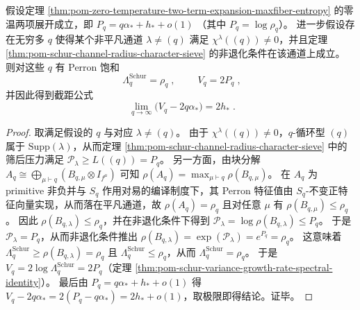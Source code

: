 \begin{proposition}\label{prop:pom-variance-intercept-equals-groundstate-entropy}
假设定理 \ref{thm:pom-zero-temperature-two-term-expansion-maxfiber-entropy} 的零温两项展开成立，即
\(
P_q=q\alpha_\ast+h_\ast+o(1)
\)
（其中 \(P_q=\log\rho_q\)）。
进一步假设存在无穷多 \(q\) 使得某个非平凡通道 \(\lambda\neq(q)\) 满足 \(\chi^\lambda((q))\neq 0\)，并且定理 \ref{thm:pom-schur-channel-radius-character-sieve} 的非退化条件在该通道上成立。
则对这些 \(q\) 有 Perron 饱和
\[
\boxed{\;\Lambda_q^{\mathrm{Schur}}=\rho_q\;},
\qquad
\boxed{\;V_q=2P_q\;},
\]
并因此得到截距公式
\[
\boxed{\;
\lim_{q\to\infty}\bigl(V_q-2q\alpha_\ast\bigr)=2h_\ast\; } .
\]
\end{proposition}
\begin{proof}
取满足假设的 \(q\) 与对应 \(\lambda\neq(q)\)。
由于 \(\chi^\lambda((q))\neq 0\)，\(q\)-循环型 \((q)\) 属于 \(\mathrm{Supp}(\lambda)\)，从而定理 \ref{thm:pom-schur-channel-radius-character-sieve} 中的筛后压力满足
\(
\mathcal P_\lambda\ge L((q))=P_q
\)。
另一方面，由块分解
\(
A_q\cong\bigoplus_{\mu\vdash q}(B_{q,\mu}\otimes I_{f^\mu})
\)
可知 \(\rho(A_q)=\max_{\mu\vdash q}\rho(B_{q,\mu})\)。
在 \(A_q\) 为 primitive 非负并与 \(S_q\) 作用对易的编译制度下，其 Perron 特征值由 \(S_q\)-不变正特征向量实现，从而落在平凡通道，故 \(\rho(A_q)=\rho_q\) 且对任意 \(\mu\) 有 \(\rho(B_{q,\mu})\le \rho_q\)。
因此 \(\rho(B_{q,\lambda})\le \rho_q\)，并在非退化条件下得到
\(\mathcal P_\lambda=\log\rho(B_{q,\lambda})\le P_q\)。
于是 \(\mathcal P_\lambda=P_q\)，从而非退化条件推出
\(
\rho(B_{q,\lambda})=\exp(\mathcal P_\lambda)=e^{P_q}=\rho_q
\)。
这意味着 \(\Lambda_q^{\mathrm{Schur}}\ge \rho(B_{q,\lambda})=\rho_q\) 且 \(\Lambda_q^{\mathrm{Schur}}\le \rho_q\)，从而 \(\Lambda_q^{\mathrm{Schur}}=\rho_q\)。
于是 \(V_q=2\log\Lambda_q^{\mathrm{Schur}}=2P_q\)（定理 \ref{thm:pom-schur-variance-growth-rate-spectral-identity}）。
最后由 \(P_q=q\alpha_\ast+h_\ast+o(1)\) 得
\(
V_q-2q\alpha_\ast=2(P_q-q\alpha_\ast)=2h_\ast+o(1)
\)，取极限即得结论。证毕。
\end{proof}

